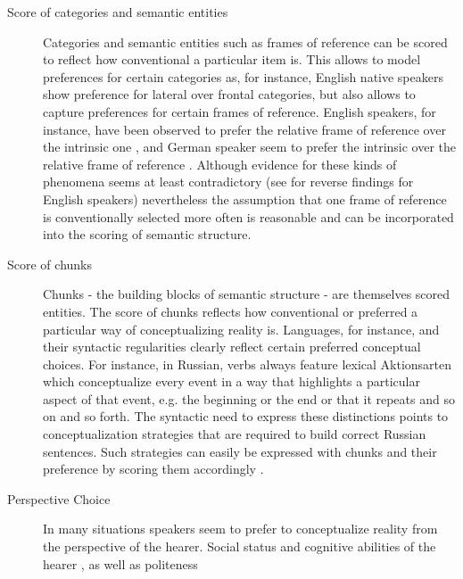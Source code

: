 \begin{description}
\item[Score of categories and semantic entities]
Categories and semantic entities such as frames of reference can be 
scored to reflect how 
conventional a particular item is. This allows to model preferences for
certain categories as, for instance, English native speakers show
preference for lateral over frontal categories, but also allows to 
capture \citep{tversky1999speakers} preferences for certain 
frames of reference. English speakers, for instance, 
have been observed to prefer the relative frame of reference
over the intrinsic one \citep{levinson2003space},
and German speaker seem to prefer the intrinsic over the relative frame of reference 
\citep{ehrich1985linguistik}. Although evidence for these kinds of phenomena
seems at least contradictory (see \citealp{miller1976language} for 
reverse findings for English speakers) nevertheless the assumption
that one frame of reference is conventionally selected more often 
is reasonable and can be incorporated into the 
scoring of semantic structure.
\item[Score of chunks]
Chunks - the building blocks of semantic structure - are themselves scored entities.
The score of chunks reflects how conventional or preferred a 
particular way of conceptualizing reality is. Languages, for instance, and their
syntactic regularities clearly reflect certain preferred conceptual choices. For instance,
in Russian, verbs always feature lexical Aktionsarten which conceptualize every event
in a way that highlights a particular aspect of that event, e.g. the beginning or the end or
that it repeats and so on and so forth. The syntactic need to express
these distinctions points to conceptualization strategies that are required to
build correct Russian sentences. Such strategies can easily be expressed with chunks
and their preference by scoring them accordingly \citep{gerasymova2010acquisition}.
\item[Perspective Choice]
In many situations speakers seem to prefer to conceptualize
reality from the perspective of the hearer. Social status and
cognitive abilities of the hearer \citep{mainwaring2003descriptions}, 
as well as politeness \citep{schober1993spatial} 

\end{description}
